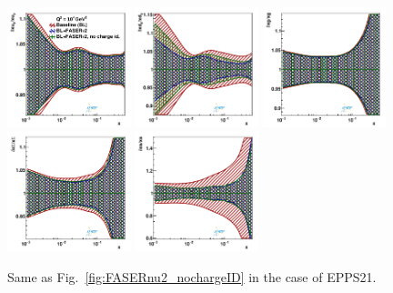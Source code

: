 \begin{figure}[t]
\centering
\includegraphics[width=0.32\textwidth]{plots/nuclear_fasernu2/nochargediscrimination/statOnly_FASERv2_q2_10000_pdf_uv_ratio.pdf}
\includegraphics[width=0.32\textwidth]{plots/nuclear_fasernu2/nochargediscrimination/statOnly_FASERv2_q2_10000_pdf_dv_ratio.pdf}
\includegraphics[width=0.32\textwidth]{plots/nuclear_fasernu2/nochargediscrimination/statOnly_FASERv2_q2_10000_pdf_g_ratio.pdf}\\
\includegraphics[width=0.32\textwidth]{plots/nuclear_fasernu2/nochargediscrimination/statOnly_FASERv2_q2_10000_pdf_Sea_ratio.pdf}
\includegraphics[width=0.32\textwidth]{plots/nuclear_fasernu2/nochargediscrimination/statOnly_FASERv2_q2_10000_pdf_s_ratio.pdf}
\caption{Same as Fig.~\ref{fig:FASERnu2_nochargeID} in the case of EPPS21.
}
\label{fig:EPPS21_nochargeID}
\end{figure}


